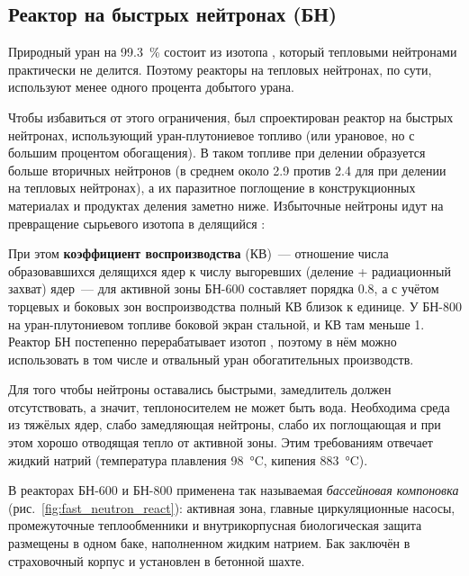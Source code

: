 \subsection*{Реактор на быстрых нейтронах (БН)}

Природный уран на \qty{99,3}{\percent} состоит из изотопа , который тепловыми нейтронами практически не делится. Поэтому реакторы на тепловых нейтронах, по сути, используют менее одного процента добытого урана.

Чтобы избавиться от этого ограничения, был спроектирован реактор на быстрых нейтронах, использующий уран-плутониевое топливо (или урановое, но с большим процентом обогащения). В таком топливе при делении  образуется больше вторичных нейтронов (в среднем около \num{2,9} против \num{2,4} для  при делении на тепловых нейтронах), а их паразитное поглощение в конструкционных материалах и продуктах деления заметно ниже. Избыточные нейтроны идут на превращение сырьевого изотопа  в делящийся :


При этом \textbf{коэффициент воспроизводства} (КВ)~--- отношение числа образовавшихся делящихся ядер к числу выгоревших (деление + радиационный захват) ядер~--- для активной зоны БН-600 составляет порядка \num{0,8}, а с учётом торцевых и боковых зон воспроизводства полный КВ близок к единице. У БН-800 на уран-плутониевом топливе боковой экран стальной, и КВ там меньше 1. Реактор БН постепенно перерабатывает изотоп , поэтому в нём можно использовать в том числе и отвальный уран обогатительных производств.

Для того чтобы нейтроны оставались быстрыми, замедлитель должен отсутствовать, а значит, теплоносителем не может быть вода. Необходима среда из тяжёлых ядер, слабо замедляющая нейтроны, слабо их поглощающая и при этом хорошо отводящая тепло от активной зоны. Этим требованиям отвечает жидкий натрий (температура плавления \qty{98}{\degreeCelsius}, кипения \qty{883}{\degreeCelsius}).

В реакторах БН-600 и БН-800 применена так называемая \emph{бассейновая компоновка} (рис.~\ref{fig:fast_neutron_react}): активная зона, главные циркуляционные насосы, промежуточные теплообменники и внутрикорпусная биологическая защита размещены в одном баке, наполненном жидким натрием. Бак заключён в страховочный корпус и установлен в бетонной шахте.

